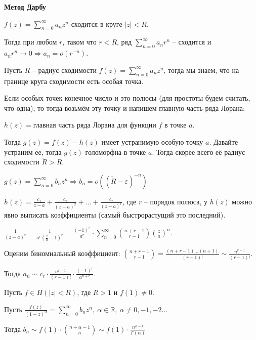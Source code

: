\begin{example}
    \textbf{Метод Дарбу}

    $f(z) = \sum_{n = 0}^{\infty} a_n z^n$ сходится в круге $|z| < R$.

    Тогда при любом $r$, таком что $r < R$, ряд $\sum_{n = 0}^{\infty} a_n r^n$ -- сходится и $a_n r^n \rightarrow 0 \Rightarrow a_n = o(r^{-n})$.

    Пусть $R$ -- радиус сходимости $f(z) = \sum_{n = 0}^{\infty} a_n z^n$, тогда мы знаем, что на границе круга сходимости есть особая точка.

    Если особых точек конечное число и это полюсы (для простоты будем считать, что одна), то тогда возьмём эту точку и напишем главную часть ряда Лорана:

    $h(z) = \text{главная часть ряда Лорана для функции $f$ в точке $a$}$.

    Тогда $g(z) = f(z) - h(z)$ имеет устранимую особую точку $a$. Давайте устраним ее, тогда $g(z)$ голоморфна в точке $a$. Тогда скорее всего её радиус сходимости $\tilde{R} > R$.

    $g(z) = \sum_{n = 0}^{\infty} b_n z^n \Rightarrow b_n =  o((\tilde{R} - \varepsilon)^{-n})$

    $h(z) = \frac{c_1}{z - a} + \frac{c_2}{(z - a)^2} + \ldots + \frac{c_r}{(z - a)^r}$, где $r$ -- порядок полюса, у $h(z)$ можно явно выписать коэффициенты (самый быстрорастущий это последний).

    $\frac{1}{(z - a)^r} = \frac{1}{a^r \left(\frac{z}{a} - 1\right)^r} = \frac{(-1)^r}{a^r} \cdot \sum_{n = 0}^{\infty} \binom{n + r - 1}{r - 1} \left( \frac{z}{a} \right)^n$.

    Оценим биномиальный коэффициент: $\binom{n + r - 1}{r - 1} = \frac{(n + r - 1) \ldots (n + 1)}{(r - 1)!} \sim \frac{n^{r - 1}}{(r - 1)!}$.

    Тогда $a_n \sim c_r \cdot \frac{n^{r - 1}}{(r - 1)!} \cdot \frac{(-1)^r}{a^{n + r}}$.
\end{example}

\begin{theorem}
    Пусть $f \in H(|z| < R)$, где $R > 1$ и $f(1) \neq 0$.

    Пусть $\frac{f(z)}{(1 - z)^\alpha} = \sum_{n = 0}^{\infty} b_n z^n, \ \alpha \in \mathbb{R}, \ \alpha \neq 0, -1, -2 \ldots$

    Тогда $b_n \sim f(1) \cdot \binom{n + \alpha - 1}{n} \sim f(1) \cdot \frac{n^{\alpha - 1}}{\Gamma (\alpha)}$
\end{theorem}


